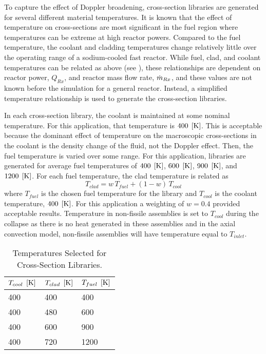     To capture the effect of Doppler broadening, cross-section libraries are
    generated for several different material temperatures.
    It is known that the effect of temperature on cross-sections are most
    significant in the fuel region where temperatures can be extreme at high
    reactor powers. Compared to the fuel temperature, the coolant and cladding
    temperatures change relatively little over the operating range of a
    sodium-cooled fast reactor.
    While fuel, clad, and coolant temperatures can be related as above (see
    ), these
    relationships are dependent on reactor power, $Q_{Rx}$, and reactor mass 
    flow rate, $\dot{m}_{Rx}$, and these values are not known before the
    simulation for a general reactor. Instead, a simplified temperature 
    relationship is used to generate the cross-section libraries.

    In each cross-section library, the coolant is maintained at some nominal
    temperature. For this application, that temperature is $400 \;\left[\text{{K}}\right]$. This
    is acceptable because the dominant effect of temperature on the macroscopic
    cross-sections in the coolant is the density change of the fluid, not the
    Doppler effect. Then, the fuel temperature is varied over some range. For
    this application, libraries are generated for average fuel temperatures of 
    $400 \;\left[\text{{K}}\right]$, $600 \;\left[\text{{K}}\right]$, $900 \;\left[\text{{K}}\right]$, and $1200 \;\left[\text{{K}}\right]$. For
    each fuel temperature, the clad temperature is related as 
    \begin{equation}
      T_{clad} = w \, T_{fuel} + (1-w) \, T_{cool}
    \end{equation}
    where $T_{fuel}$ is the chosen fuel temperature for the library and
    $T_{cool}$ is the coolant temperature, $400 \;\left[\text{{K}}\right]$. For this application
    a weighting of $w=0.4$ provided acceptable results. Temperature in
    non-fissile assemblies is set to $T_{cool}$ during the collapse as there is
    no heat generated in these assemblies and in the axial convection model,
    non-fissile assemblies will have temperature equal to $T_{inlet}$.

    \begin{table}
      \caption{Temperatures Selected for Cross-Section Libraries.}
      \label{tab:xstemps}
      \begin{center}
        \begin{tabular}{lll}
          \toprule
          $T_{cool} \;\left[\text{{K}}\right]$ & $T_{clad} \;\left[\text{{K}}\right]$ & $T_{fuel} \;\left[\text{{K}}\right]$ \\
          \midrule
          400 & 400 & 400  \\
          400 & 480 & 600  \\
          400 & 600 & 900  \\
          400 & 720 & 1200 \\
          \bottomrule
        \end{tabular}
      \end{center}
    \end{table}

